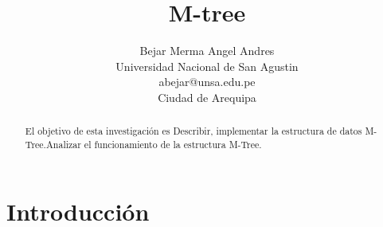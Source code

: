 \documentclass[a4paper]{article}
\title{M-tree}
\author{Bejar Merma Angel Andres\\
  \small Universidad Nacional de San Agustin\\
  \small abejar@unsa.edu.pe\\
  \small Ciudad de Arequipa
  \date{}
}
\begin{document}
\maketitle

\begin{abstract}
El objetivo de esta investigación es Describir, implementar la estructura de datos M-Tree.Analizar el funcionamiento de la estructura M-Tree.
\end{abstract}

\section{Introducci\'on}
\end{document}
